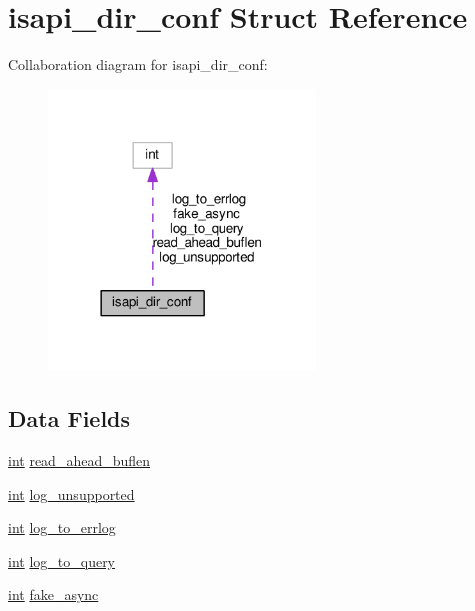 \hypertarget{structisapi__dir__conf}{}\section{isapi\+\_\+dir\+\_\+conf Struct Reference}
\label{structisapi__dir__conf}


Collaboration diagram for isapi\+\_\+dir\+\_\+conf\+:
\nopagebreak
\begin{figure}[H]
\begin{center}
\leavevmode
\includegraphics[width=201pt]{structisapi__dir__conf__coll__graph}
\end{center}
\end{figure}
\subsection*{Data Fields}
\begin{DoxyCompactItemize}
\item 
\hyperlink{pcre_8txt_a42dfa4ff673c82d8efe7144098fbc198}{int} \hyperlink{structisapi__dir__conf_a31ff905f11788b562df21900f44423bd}{read\+\_\+ahead\+\_\+buflen}
\item 
\hyperlink{pcre_8txt_a42dfa4ff673c82d8efe7144098fbc198}{int} \hyperlink{structisapi__dir__conf_a340c66394f9ce2dba82d6df159fa35be}{log\+\_\+unsupported}
\item 
\hyperlink{pcre_8txt_a42dfa4ff673c82d8efe7144098fbc198}{int} \hyperlink{structisapi__dir__conf_a43aef722def3a1fa326cf28951392eaf}{log\+\_\+to\+\_\+errlog}
\item 
\hyperlink{pcre_8txt_a42dfa4ff673c82d8efe7144098fbc198}{int} \hyperlink{structisapi__dir__conf_aaf2afbac2051ff8a55b31f5cf1759479}{log\+\_\+to\+\_\+query}
\item 
\hyperlink{pcre_8txt_a42dfa4ff673c82d8efe7144098fbc198}{int} \hyperlink{structisapi__dir__conf_a99f75cf31a141b46e02cd856911f53eb}{fake\+\_\+async}
\end{DoxyCompactItemize}


